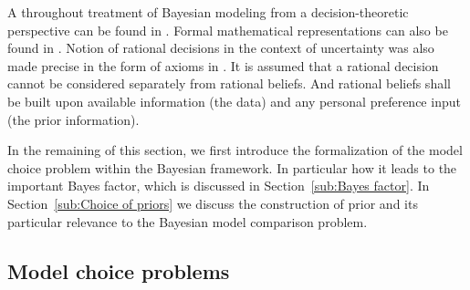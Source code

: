 A throughout treatment of Bayesian modeling from a decision-theoretic
perspective can be found in \cite{Robert:2007tc}. Formal mathematical
representations can also be found in \cite[][sec.~5.1 and
sec.~6.1]{Bernardo:1994vd}. Notion of rational decisions in the context of
uncertainty was also made precise in the form of axioms in
\cite{DeFinetti:1974tg,DeFinetti:1975ua}. It is assumed that a rational
decision cannot be considered separately from rational beliefs. And rational
beliefs shall be built upon available information (the data) and any personal
preference input (the prior information).

In the remaining of this section, we first introduce the formalization of the
model choice problem within the Bayesian framework. In particular how it leads
to the important Bayes factor, which is discussed in Section~\ref{sub:Bayes
  factor}. In Section~\ref{sub:Choice of priors} we discuss the construction
of prior and its particular relevance to the Bayesian model comparison
problem.

\subsection{Model choice problems}
\label{sub:Model choice problems}


